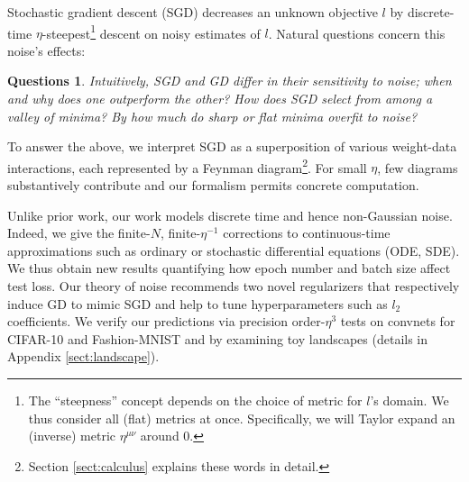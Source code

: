 \documentclass{article}
\theoremstyle{plain}
\newtheorem*{quests*}{Questions}
\theoremstyle{definition}
\begin{document}

        Stochastic gradient descent (SGD) decreases an unknown objective $l$ by
        discrete-time $\eta$-steepest\footnote{
            The ``steepness'' concept depends on the choice of metric for
            $l$'s domain.  We thus consider all (flat) metrics at once.
            Specifically, we will Taylor expand an (inverse) metric
            $\eta^{\mu\nu}$ around $0$.
        } descent on noisy estimates of $l$.
        Natural questions concern this noise's effects:
        \begin{quests*}
            Intuitively, SGD and GD differ in their sensitivity to noise;
                when and why does one outperform the other?
            How does SGD select from among a valley of minima?
            By how much do sharp or flat minima overfit to noise?
        \end{quests*}
        To answer the above, we interpret SGD as a superposition of
        various weight-data interactions, each represented by a Feynman
        diagram\footnote{
            Section \ref{sect:calculus} explains these words in detail.
        }.
        For small $\eta$, few diagrams substantively contribute and
        our formalism permits concrete computation.


        Unlike prior work, our work models discrete time and hence non-Gaussian
        noise.  Indeed, we give the finite-$N$, finite-$\eta^{-1}$ corrections
        to continuous-time approximations such as ordinary or stochastic
        differential equations (ODE, SDE).  We thus obtain new results
        quantifying how epoch number and batch size affect test loss.  Our
        theory of noise recommends two novel regularizers that respectively
        induce GD to mimic SGD and help to tune hyperparameters such as $l_2$
        coefficients.  We verify our predictions via precision order-$\eta^3$
        tests on convnets for CIFAR-10 and Fashion-MNIST and 
        by examining toy landscapes (details in Appendix \ref{sect:landscape}).

\end{document}

